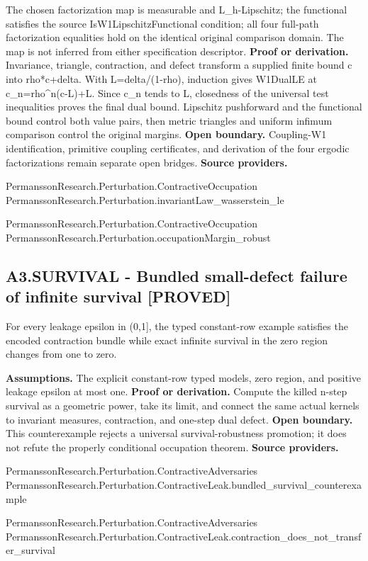 \documentclass[11pt,a4paper]{article}
\begin{document}
The chosen factorization map is measurable and L\_h-Lipschitz; the functional satisfies the source IsW1LipschitzFunctional condition; all four full-path factorization equalities hold on the identical original comparison domain. The map is not inferred from either specification descriptor.
\textbf{Proof or derivation.} Invariance, triangle, contraction, and defect transform a supplied finite bound c into rho*c+delta. With L=delta/(1-rho), induction gives W1DualLE at c\_n=rho\textasciicircum{}n(c-L)+L. Since c\_n tends to L, closedness of the universal test inequalities proves the final dual bound. Lipschitz pushforward and the functional bound control both value pairs, then metric triangles and uniform infimum comparison control the original margins.
\textbf{Open boundary.} Coupling-W1 identification, primitive coupling certificates, and derivation of the four ergodic factorizations remain separate open bridges.
\textbf{Source providers.}
{\footnotesize\raggedright PermanssonRe\allowbreak{}search.Pertu\allowbreak{}rbation.Cont\allowbreak{}ractiveOccup\allowbreak{}ation\\ PermanssonRe\allowbreak{}search.Pertu\allowbreak{}rbation.inva\allowbreak{}riantLaw\_was\allowbreak{}serstein\_le\par}
{\footnotesize\raggedright PermanssonRe\allowbreak{}search.Pertu\allowbreak{}rbation.Cont\allowbreak{}ractiveOccup\allowbreak{}ation\\ PermanssonRe\allowbreak{}search.Pertu\allowbreak{}rbation.occu\allowbreak{}pationMargin\allowbreak{}\_robust\par}
\subsection*{A3.SURVIVAL - Bundled small-defect failure of infinite survival [PROVED]}
For every leakage epsilon in (0,1], the typed constant-row example satisfies the encoded contraction bundle while exact infinite survival in the zero region changes from one to zero.

\textbf{Assumptions.} The explicit constant-row typed models, zero region, and positive leakage epsilon at most one.
\textbf{Proof or derivation.} Compute the killed n-step survival as a geometric power, take its limit, and connect the same actual kernels to invariant measures, contraction, and one-step dual defect.
\textbf{Open boundary.} This counterexample rejects a universal survival-robustness promotion; it does not refute the properly conditional occupation theorem.
\textbf{Source providers.}
{\footnotesize\raggedright PermanssonRe\allowbreak{}search.Pertu\allowbreak{}rbation.Cont\allowbreak{}ractiveAdver\allowbreak{}saries\\ PermanssonRe\allowbreak{}search.Pertu\allowbreak{}rbation.Cont\allowbreak{}ractiveLeak.\allowbreak{}bundled\_surv\allowbreak{}ival\_counter\allowbreak{}example\par}
{\footnotesize\raggedright PermanssonRe\allowbreak{}search.Pertu\allowbreak{}rbation.Cont\allowbreak{}ractiveAdver\allowbreak{}saries\\ PermanssonRe\allowbreak{}search.Pertu\allowbreak{}rbation.Cont\allowbreak{}ractiveLeak.\allowbreak{}contraction\_\allowbreak{}does\_not\_tra\allowbreak{}nsfer\_surviv\allowbreak{}al\par}
\end{document}
